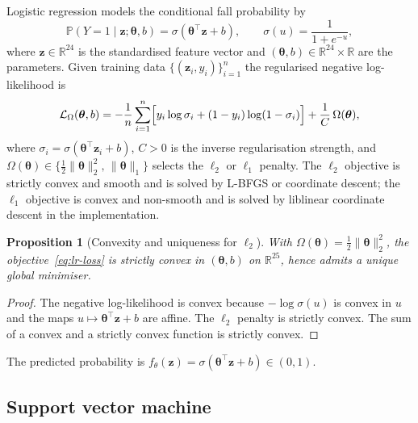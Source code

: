 \documentclass[onluarkali,ingilizce,yukseklisans,karton,LisansustuEgitim]{itutez}
\newtheorem{proposition}{Proposition}[chapter]
\providecommand{\R}{\mathbb{R}}
\providecommand{\Prob}{\mathbb{P}}
\providecommand{\1}{\mathbf{1}}
\begin{document}
Logistic regression models the conditional fall probability by
\begin{equation}
  \Prob(Y=1\mid\mathbf{z};\boldsymbol\theta,b)=\sigma(\boldsymbol\theta^\top\mathbf{z}+b),
  \qquad
  \sigma(u)=\frac{1}{1+e^{-u}},
  \label{eq:lr-sigmoid}
\end{equation}
where $\mathbf{z}\in\R^{24}$ is the standardised feature vector and $(\boldsymbol\theta,b)\in\R^{24}\times\R$ are the parameters. Given training data $\{(\mathbf{z}_i,y_i)\}_{i=1}^n$ the regularised negative log-likelihood is
\begin{equation}
  \mathcal{L}_\Omega(\boldsymbol\theta,b)
  =-\frac{1}{n}\sum_{i=1}^n\Bigl[y_i\log\sigma_i+(1-y_i)\log(1-\sigma_i)\Bigr]
  +\frac{1}{C}\,\Omega(\boldsymbol\theta),
  \label{eq:lr-loss}
\end{equation}
where $\sigma_i=\sigma(\boldsymbol\theta^\top\mathbf{z}_i+b)$, $C>0$ is the inverse regularisation strength, and $\Omega(\boldsymbol\theta)\in\{\tfrac12\|\boldsymbol\theta\|_2^2,\,\|\boldsymbol\theta\|_1\}$ selects the $\ell_2$ or $\ell_1$ penalty. The $\ell_2$ objective is strictly convex and smooth and is solved by L-BFGS or coordinate descent; the $\ell_1$ objective is convex and non-smooth and is solved by liblinear coordinate descent in the implementation.

\begin{proposition}[Convexity and uniqueness for $\ell_2$]
\label{prop:lr-convex}
With $\Omega(\boldsymbol\theta)=\tfrac12\|\boldsymbol\theta\|_2^2$, the objective~\eqref{eq:lr-loss} is strictly convex in $(\boldsymbol\theta,b)$ on $\R^{25}$, hence admits a unique global minimiser.
\end{proposition}

\begin{proof}
The negative log-likelihood is convex because $-\log\sigma(u)$ is convex in $u$ and the maps $u\mapsto\boldsymbol\theta^\top\mathbf{z}+b$ are affine. The $\ell_2$ penalty is strictly convex. The sum of a convex and a strictly convex function is strictly convex.
\end{proof}

The predicted probability is $f_\theta(\mathbf{z})=\sigma(\boldsymbol\theta^\top\mathbf{z}+b)\in(0,1)$.

\subsection{Support vector machine}
\label{subsubsec:svm}
\end{document}
